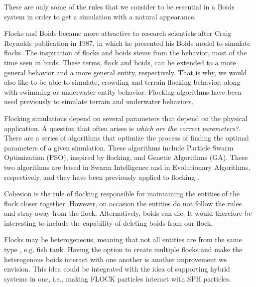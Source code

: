 These are only some of the rules that we consider to be essential in a Boids system in order to get a simulation with a natural appearance.

Flocks and Boids became more attractive to research scientists after Craig Reynolds publication in 1987\cite{craig1}, in which he presented his Boids model to simulate flocks. The inspiration of flocks and boids stems from the behavior, most of the time seen in birds. These terms, flock and boids, can be extended to a more general behavior and a more general entity, respectively. That is why, we would also like to be able to simulate, crowding and terrain flocking behavior, along with swimming or underwater entity behavior. Flocking algorithms have been used previously to simulate terrain and underwater behaviors\cite{supermassiveCrowd}. 

Flocking simulations depend on several parameters that depend on the physical application. A question that often arises is \textit{which are the correct parameters?}. There are a series of algorithms that optimize the process of finding the optimal parameters of a given simulation. These algorithms include Particle Swarm Optimization (PSO), inspired by flocking, and Genetic Algorithms (GA). These two algorithms are based in Swarm Intelligence and in Evolutionary Algorithms, respectively, and they have been previously applied to flocking \cite{TODO:needReference}.

Cohesion is the rule of flocking responsible for maintaining the entities of the flock closer together. However, on occasion the entities do not follow the rules and stray away from the flock. Alternatively, boids can die. It would therefore be interesting to include 
the capability of deleting boids from our flock. 

Flocks may be heterogeneous, meaning that not all entities are from the same type , e.g. fish tank. Having the option to create multiple flocks and make the heterogenous boids interact with one another is another improvement we envision. This idea could be integrated  with the idea of supporting hybrid systems in one, i.e., making FLOCK particles interact with SPH particles.

